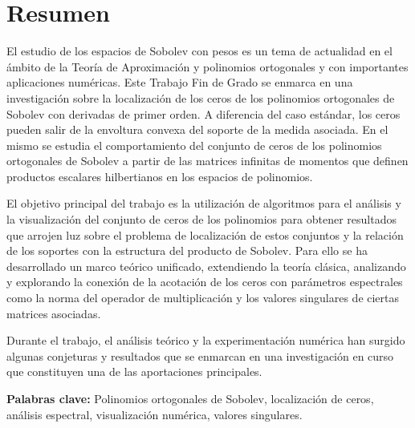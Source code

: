 \chapter*{Resumen}

El estudio de los espacios de Sobolev con pesos es un tema de actualidad en el ámbito de la Teoría de Aproximación y polinomios ortogonales y con importantes aplicaciones numéricas. Este Trabajo Fin de Grado se enmarca en una investigación sobre  la localización de los ceros de los polinomios ortogonales de Sobolev con derivadas de primer orden.  A diferencia del caso estándar,
los ceros pueden salir de la envoltura convexa del soporte de la medida asociada. En el mismo se estudia  el comportamiento  del conjunto de ceros de los polinomios ortogonales de Sobolev  a partir de las matrices infinitas de momentos que definen productos escalares hilbertianos en los espacios de polinomios.

El objetivo principal  del trabajo es la utilización de algoritmos  para el análisis y  la visualización del conjunto de ceros de los polinomios para obtener resultados que arrojen luz sobre el problema de localización de estos conjuntos y  la relación de los soportes con la estructura del producto de Sobolev. Para ello se ha desarrollado un marco teórico unificado, extendiendo la teoría clásica, analizando y explorando  la
conexión de  la acotación de los ceros con  parámetros espectrales como la norma del operador de multiplicación y los valores singulares de ciertas matrices asociadas.

Durante el trabajo, el análisis teórico y la experimentación numérica han surgido algunas conjeturas y resultados  que se enmarcan en una  investigación en curso  que constituyen una de las aportaciones principales.

\textbf{Palabras clave:} Polinomios ortogonales de Sobolev, localización de ceros, análisis espectral, visualización numérica, valores singulares.


